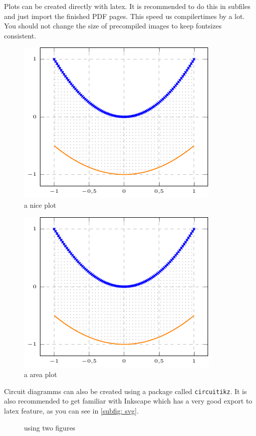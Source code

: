 \documentclass[	%
		11pt,a4paper,	%
		twoside,		%
		english,		%
		f1				%
	]{HsH-report}		%
\begin{document}
	Plots can be created directly with latex. It is recommended to do this in subfiles and just import the finished PDF pages. This speed us
	compilertimes by a lot. You should not change the size of precompiled images to keep fontsizes consistent.
	\pagebreak
	\begin{figure}
		\includegraphics[page=2]{plt/examplePlot.pdf}
		\caption[centering]{a nice plot}
		\label{fig: plot1}
	\end{figure}
	\begin{figure}
		\includegraphics[page=1]{plt/examplePlot.pdf}
		\caption{a area plot}
		\label{fig: area}
	\end{figure}

	Circuit diagramms can also be created using a package called \lstinline{circuitikz}. It is also recommended to get familiar with Inkscape which
	has a very good export to latex feature, as you can see in \autoref{subfig: svg}.
	\begin{figure}
		\hspace{2cm}
		\caption{using two figures}
	\end{figure}
\end{document}
